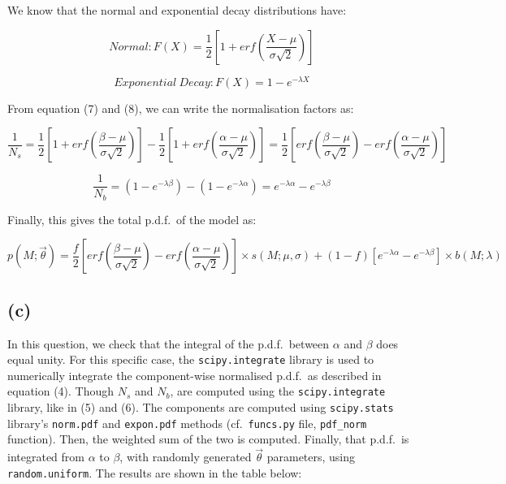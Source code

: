 \documentclass[12pt]{report} %
\begin{document}
\vspace*{1\baselineskip}
We know that the normal and exponential decay distributions have:  

\begin{equation}
    Normal: \displaystyle F(X) = \frac{1}{2}[1 + erf(\frac{X - \mu}{\sigma\sqrt{2}})]
\end{equation}  

\begin{equation}
    Exponential\ Decay: \displaystyle F(X) = 1 - e^{-\lambda X}
\end{equation}  

\vspace*{1\baselineskip}
From equation (7) and (8), we can write the normalisation factors as:

\begin{equation}
    \frac{1}{N_{s}} = \frac{1}{2}[1 + erf(\frac{\beta - \mu}{\sigma\sqrt{2}})] - \frac{1}{2}[1 + erf(\frac{\alpha - \mu}{\sigma\sqrt{2}})] = \frac{1}{2}[erf(\frac{\beta - \mu}{\sigma\sqrt{2}}) - erf(\frac{\alpha - \mu}{\sigma\sqrt{2}})]
\end{equation}

\begin{equation}
    \frac{1}{N_{b}} = (1 - e^{-\lambda \beta}) - (1 - e^{-\lambda \alpha}) = e^{-\lambda \alpha} - e^{-\lambda \beta}
\end{equation}

\vspace*{1\baselineskip}
Finally, this gives the total p.d.f.\ of the model as:

\begin{equation}
    p(M;\vec{\theta}) = \frac{f}{2}[erf(\frac{\beta - \mu}{\sigma\sqrt{2}}) - erf(\frac{\alpha - \mu}{\sigma\sqrt{2}})] \times s(M;\mu,\sigma) + (1 - f)[e^{-\lambda \alpha} - e^{-\lambda \beta}] \times b(M;\lambda)
\end{equation}

\subsection*{(c)}

In this question, we check that the integral of the p.d.f.\ between $\alpha$ and $\beta$ does equal unity. For this specific case, the \texttt{scipy.integrate} library is used to numerically integrate the component-wise normalised p.d.f.\ as described in equation (4). Though $N_{s}$ and $N_{b}$, are computed using the \texttt{scipy.integrate} library, like in (5) and (6). The components are computed using \texttt{scipy.stats} library's \texttt{norm.pdf} and \texttt{expon.pdf} methods (cf.\ \texttt{funcs.py} file, \texttt{pdf\_norm} function). Then, the weighted sum of the two is computed. Finally, that p.d.f.\ is integrated from $\alpha$ to $\beta$, with randomly generated $\vec{\theta}$ parameters, using \texttt{random.uniform}. The results are shown in the table below:
\end{document}
